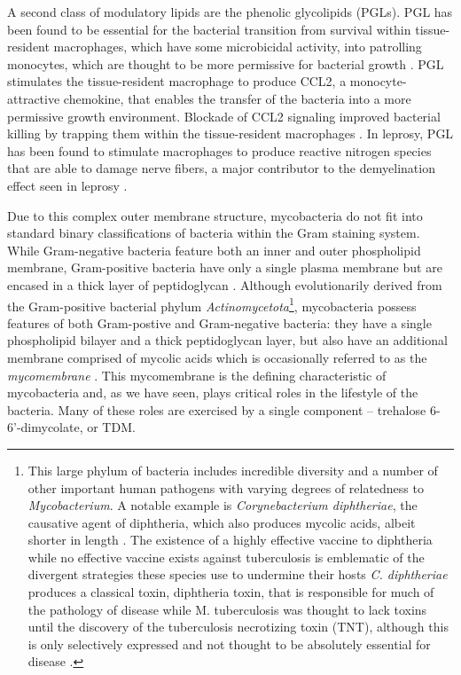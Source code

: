 A second class of modulatory lipids are the phenolic glycolipids (PGLs). PGL has been found to be essential for the bacterial transition from survival within tissue\hyp{}resident macrophages, which have some microbicidal activity, into patrolling monocytes, which are thought to be more permissive for bacterial growth \citep{Barnes2017, Sinsimer2008}. PGL stimulates the tissue\hyp{}resident macrophage to produce CCL2, a monocyte\hyp{}attractive chemokine, that enables the transfer of the bacteria into a more permissive growth environment. Blockade of CCL2 signaling improved bacterial killing by trapping them within the tissue\hyp{}resident macrophages \citep{Cambier2014b, Cambier2017}. In leprosy, PGL has been found to stimulate macrophages to produce reactive nitrogen species that are able to damage nerve fibers, a major contributor to the demyelination effect seen in leprosy \citep{Madigan2017}.

Due to this complex outer membrane structure, mycobacteria do not fit into standard binary classifications of bacteria within the Gram staining system. While Gram\hyp{}negative bacteria feature both an inner and outer phospholipid membrane, Gram\hyp{}positive bacteria have only a single plasma membrane but are encased in a thick layer of peptidoglycan \citep{Carlone1982, Salton1953}. Although evolutionarily derived from the Gram\hyp{}positive bacterial phylum \textit{Actinomycetota}\footnote{This large phylum of bacteria includes incredible diversity and a number of other important human pathogens with varying degrees of relatedness to \textit{Mycobacterium}. A notable example is \textit{Corynebacterium diphtheriae}, the causative agent of diphtheria, which also produces mycolic acids, albeit shorter in length \citep{vanderPeet2015}. The existence of a highly effective vaccine to diphtheria while no effective vaccine exists against tuberculosis is emblematic of the divergent strategies these species use to undermine their hosts \textit{C. diphtheriae} produces a classical toxin, diphtheria toxin, that is responsible for much of the pathology of disease while M. tuberculosis was thought to lack toxins until the discovery of the tuberculosis necrotizing toxin (TNT), although this is only selectively expressed and not thought to be absolutely essential for disease \citep{Danilchanka2014, Pajuelo2018, Pajuelo2020, Pajuelo2021, Tak2019, Tak2021, IzquierdoLafuente2021, Sun2015}.}, mycobacteria possess features of both Gram\hyp{}postive and Gram\hyp{}negative bacteria: they have a single phospholipid bilayer and a thick peptidoglycan layer, but also have an additional membrane comprised of mycolic acids which is occasionally referred to as the \textit{mycomembrane} \citep{Jankute2015, Brennan2003,  Brennan1995, Chatterjee1997}. This mycomembrane is the defining characteristic of mycobacteria and, as we have seen, plays critical roles in the lifestyle of the bacteria. Many of these roles are exercised by a single component -- trehalose 6-6'-dimycolate, or TDM.

